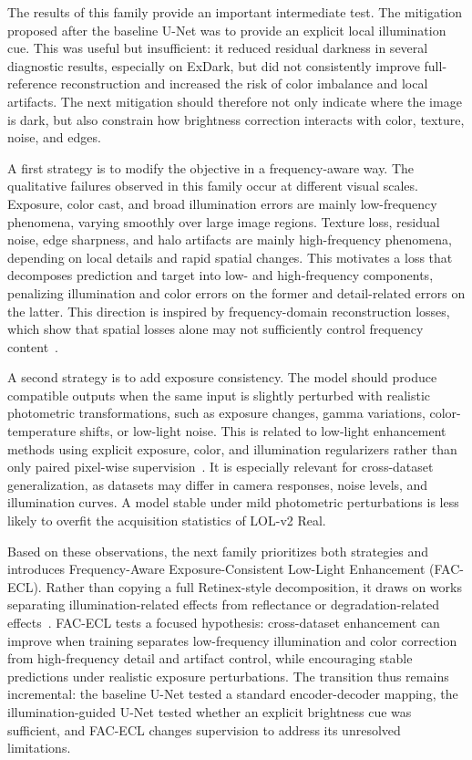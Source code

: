The results of this family provide an important intermediate test. The mitigation proposed after the baseline U-Net was to provide an explicit local illumination cue. This was useful but insufficient: it reduced residual darkness in several diagnostic results, especially on ExDark, but did not consistently improve full-reference reconstruction and increased the risk of color imbalance and local artifacts. The next mitigation should therefore not only indicate where the image is dark, but also constrain how brightness correction interacts with color, texture, noise, and edges.

A first strategy is to modify the objective in a frequency-aware way. The qualitative failures observed in this family occur at different visual scales. Exposure, color cast, and broad illumination errors are mainly low-frequency phenomena, varying smoothly over large image regions. Texture loss, residual noise, edge sharpness, and halo artifacts are mainly high-frequency phenomena, depending on local details and rapid spatial changes. This motivates a loss that decomposes prediction and target into low- and high-frequency components, penalizing illumination and color errors on the former and detail-related errors on the latter. This direction is inspired by frequency-domain reconstruction losses, which show that spatial losses alone may not sufficiently control frequency content~\cite{DBLP:conf/iccv/JiangDWL21}.

A second strategy is to add exposure consistency. The model should produce compatible outputs when the same input is slightly perturbed with realistic photometric transformations, such as exposure changes, gamma variations, color-temperature shifts, or low-light noise. This is related to low-light enhancement methods using explicit exposure, color, and illumination regularizers rather than only paired pixel-wise supervision~\cite{DBLP:conf/cvpr/GuoLGLHKC20}. It is especially relevant for cross-dataset generalization, as datasets may differ in camera responses, noise levels, and illumination curves. A model stable under mild photometric perturbations is less likely to overfit the acquisition statistics of LOL-v2 Real.

Based on these observations, the next family prioritizes both strategies and introduces Frequency-Aware Exposure-Consistent Low-Light Enhancement (FAC-ECL). Rather than copying a full Retinex-style decomposition, it draws on works separating illumination-related effects from reflectance or degradation-related effects~\cite{DBLP:conf/bmvc/WeiWY018,DBLP:journals/dsp/WeiLL24}. FAC-ECL tests a focused hypothesis: cross-dataset enhancement can improve when training separates low-frequency illumination and color correction from high-frequency detail and artifact control, while encouraging stable predictions under realistic exposure perturbations. The transition thus remains incremental: the baseline U-Net tested a standard encoder-decoder mapping, the illumination-guided U-Net tested whether an explicit brightness cue was sufficient, and FAC-ECL changes supervision to address its unresolved limitations.